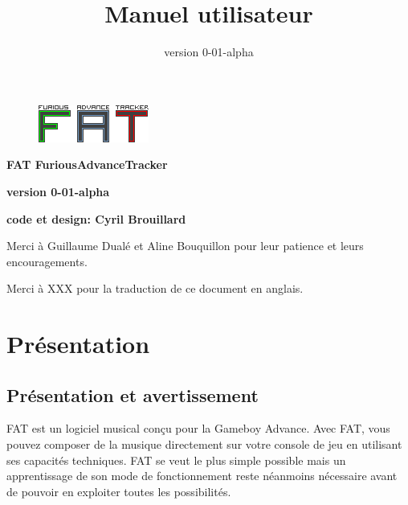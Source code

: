 \documentclass[12pt,a4paper]{article}
\title{\bf Manuel utilisateur}
\author{version 0-01-alpha}
\begin{document}
  \begin{figure}
    \begin{center}
    \includegraphics[scale=2]{images/logo}
    \end{center}
  \end{figure}
  \maketitle{}
  \thispagestyle{empty}
  \setcounter{page}{0}
  \ClearShipoutPicture

  \newpage

  \begin{center}
  
  {\bf FAT FuriousAdvanceTracker} \medskip
  
  {\bf version 0-01-alpha} \medskip
  
  {\bf code et design: Cyril Brouillard} \medskip
  
  Merci à Guillaume Dualé et Aline Bouquillon pour leur patience et leurs encouragements.\medskip
  
  Merci à XXX pour la traduction de ce document en anglais.
  \end{center}
  
  \thispagestyle{empty}
  \setcounter{page}{0}
  \ClearShipoutPicture
  \newpage
  
  \tableofcontents{}
  \newpage
  
  \section{Présentation}
    \subsection{Présentation et avertissement}
    FAT est un logiciel musical conçu pour la Gameboy Advance. Avec FAT, vous pouvez composer de la musique directement sur votre console de jeu en utilisant ses capacités techniques. FAT se veut le plus simple possible mais un apprentissage de son mode de fonctionnement reste néanmoins nécessaire avant de pouvoir en exploiter toutes les possibilités.\medskip
    
\end{document}
